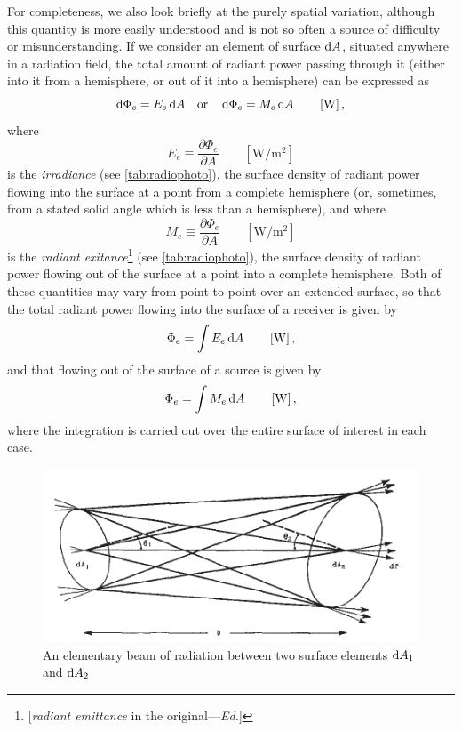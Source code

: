 \begin{refsection}
For completeness, we also look briefly at the purely spatial variation, although
this quantity is more easily understood and is not so often a source of
difficulty
or misunderstanding. If we consider an element of surface $\mathop{}\!\mathrm{d} A$, situated
anywhere
in a radiation field, the total amount of radiant power passing through it
(either
into it from a hemisphere, or out of it into a hemisphere) can be expressed as
\begin{equation*}
\d\Phi_e = E_e \d A \quad \textrm{or} \quad \d\Phi_e = M_e \d A
\qquad \left[\unit{\watt}\right],
\end{equation*}
where
\begin{equation}\label{eqn:nicodemus4}
E_e \equiv \frac{\partial \Phi_e}{\partial A}
\qquad \left[\unit{\watt\per\square\meter}\right]
\end{equation}
is the \textsl{irradiance} (see \cref{tab:radiophoto}), the surface density
of radiant power flowing into the surface at a point from a complete hemisphere
(or, sometimes, from a stated solid angle which is less than a hemisphere), and
where
\begin{equation}\label{eqn:nicodemus5}
M_e \equiv \frac{\partial \Phi_e}{\partial A}
\qquad \left[\unit{\watt\per\square\meter}\right]
\end{equation}
is the \textsl{radiant exitance}\footnote{[\textsl{radiant emittance} in the original---\textit{Ed.}]} (see \cref{tab:radiophoto}), the surface
density of radiant power flowing out of the surface at a point into a complete
hemisphere. Both of these quantities may vary from point to point over an
extended
surface, so that the total radiant power flowing into the surface of a receiver
is given by
\begin{equation}
\Phi_e = \int E_e \d A
\qquad \left[\unit{\watt}\right],
\end{equation}
and that flowing out of the surface of a source is given by
\begin{equation}
\Phi_e = \int M_e \d A
\qquad \left[\unit{\watt}\right],
\end{equation}
where the integration is carried out over the entire surface of interest in each case.

\begin{figure}
\begin{center}
\includegraphics{figures_built/nicodemus1963-fig2.pdf}
\end{center}
\caption{An elementary beam of radiation between two surface elements $\mathop{}\!\mathrm{d} A_1$ and $\mathop{}\!\mathrm{d} A_2$}
\label{fig:nicodemus2}
\end{figure}


\end{refsection}
